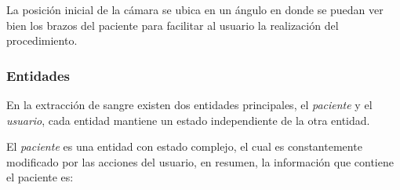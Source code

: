 La posición inicial de la cámara se ubica en un ángulo en donde se puedan ver 
bien los brazos del paciente para facilitar al usuario la realización del 
procedimiento.


\subsubsection{Entidades}

En la extracción de sangre existen dos entidades principales, el \emph{paciente}
y el \emph{usuario}, cada entidad mantiene un estado independiente de la otra
entidad.

El \emph{paciente} es una entidad con estado complejo, el cual es constantemente
modificado por las acciones del usuario, en resumen, la información que contiene
el paciente es:


